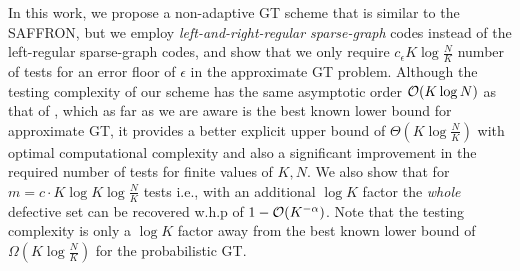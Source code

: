 \documentclass[conference,twocolumn]{IEEEtran}
\begin{document}
In this work, we propose a non-adaptive GT scheme that is similar to the SAFFRON, but we employ \textit{left-and-right-regular sparse-graph} codes instead of the left-regular sparse-graph codes, and show that we only require $c_\epsilon K\log \frac{N}{K}$ number of tests for an error floor of $\epsilon$ in the approximate GT problem.
Although the testing complexity of our scheme has the same asymptotic order $\mathcal{O}(K\log N)$ as that of \cite{lee2015saffron}, which as far as we are aware is the best known lower bound for approximate GT, it provides a better explicit upper bound of $\Theta(K\log \frac{N}{K})$ with optimal computational complexity and also a significant improvement in the required number of tests for finite values of $K,N$. 
We also show that for $m=c\cdot K\log K \log \frac{N}{K}$ tests  i.e., with an additional $\log K$ factor the \textit{whole} defective set can be recovered w.h.p of $1-\mathcal{O}(K^{-\alpha})$. Note that the testing complexity is only a $\log K$ factor away from the best known lower bound of $\Omega(K\log \frac{N}{K})$ \cite{chan2014non} for the probabilistic GT.
\end{document}
